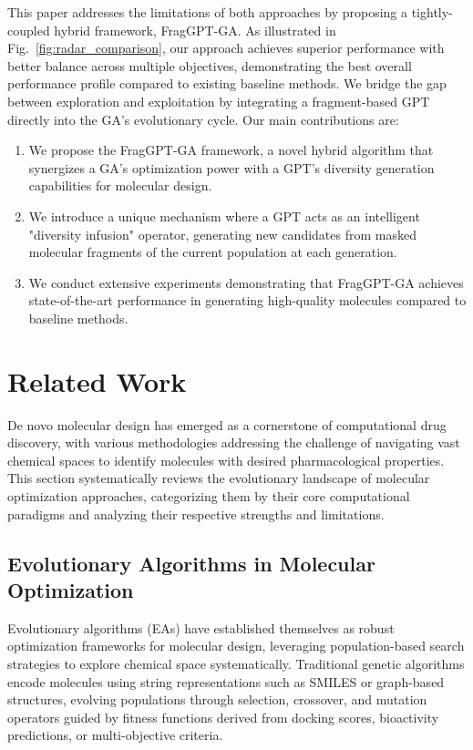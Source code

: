 \documentclass[lettersize,journal]{IEEEtran}
\begin{document}
\IEEEpubidadjcol 
This paper addresses the limitations of both approaches by proposing a tightly-coupled hybrid framework, FragGPT-GA. As illustrated in Fig.~\ref{fig:radar_comparison}, our approach achieves superior performance with better balance across multiple objectives, demonstrating the best overall performance profile compared to existing baseline methods. We bridge the gap between exploration and exploitation by integrating a fragment-based GPT directly into the GA's evolutionary cycle. Our main contributions are:
\begin{enumerate}
    \item We propose the FragGPT-GA framework, a novel hybrid algorithm that synergizes a GA's optimization power with a GPT's diversity generation capabilities for molecular design.
    \item We introduce a unique mechanism where a GPT acts as an intelligent "diversity infusion" operator, generating new candidates from masked molecular fragments of the current population at each generation.
    \item We conduct extensive experiments demonstrating that FragGPT-GA achieves state-of-the-art performance in generating high-quality molecules compared to baseline methods.
\end{enumerate}
\section{Related Work}

De novo molecular design has emerged as a cornerstone of computational drug discovery, with various methodologies addressing the challenge of navigating vast chemical spaces to identify molecules with desired pharmacological properties. This section systematically reviews the evolutionary landscape of molecular optimization approaches, categorizing them by their core computational paradigms and analyzing their respective strengths and limitations.

\subsection{Evolutionary Algorithms in Molecular Optimization}

Evolutionary algorithms (EAs) have established themselves as robust optimization frameworks for molecular design, leveraging population-based search strategies to explore chemical space systematically. Traditional genetic algorithms encode molecules using string representations such as SMILES or graph-based structures, evolving populations through selection, crossover, and mutation operators guided by fitness functions derived from docking scores, bioactivity predictions, or multi-objective criteria.
\end{document}
